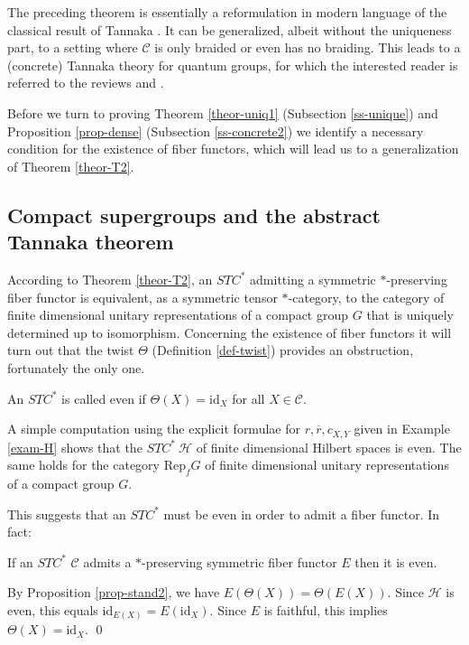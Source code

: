 \documentclass[12pt]{article}
\theoremstyle{definition}
\theoremstyle{definition}
\theoremstyle{remark}
\def\2#1{{\mathcal #1}}
\def\ol#1{{\overline #1}}
\newcommand{\Rep}{\mathrm{Rep}}
\def\id{\mathrm{id}}
\begin{document}
\brem The preceding theorem is essentially a reformulation in modern language of the classical
result of Tannaka \cite{tannaka}. It can be generalized, albeit without the uniqueness part, to a
setting where $\2C$ is only braided or even has no braiding. This leads to a (concrete) Tannaka
theory for quantum groups, for which the interested reader is referred to the reviews \cite{JS1} and
\cite{MRT}. 
\erem

Before we turn to proving Theorem \ref{theor-uniq1} (Subsection \ref{ss-unique}) and Proposition
\ref{prop-dense} (Subsection \ref{ss-concrete2}) we identify a necessary condition for the existence
of fiber functors, which will lead us to a generalization of Theorem \ref{theor-T2}.




\subsection{Compact supergroups and the abstract Tannaka theorem} 
According to Theorem \ref{theor-T2}, an $STC^*$ admitting a symmetric $*$-preserving fiber functor
is equivalent, as a symmetric tensor $*$-category, to the category of finite dimensional unitary
representations of a compact group $G$ that is uniquely determined up to isomorphism. Concerning the
existence of fiber functors it will turn out that the twist $\Theta$ (Definition \ref{def-twist})
provides an obstruction, fortunately the only one.

\bdefin {}
An $STC^*$ is called even if $\Theta(X)=\id_X$ for all $X\in\2C$.
\edefin

\bexam A simple computation using the explicit formulae for $r,\ol{r},c_{X,Y}$ given in Example
\ref{exam-H} shows that the $STC^*\ \2H$ of finite dimensional Hilbert spaces is even. The same
holds for the category $\Rep_fG$ of finite dimensional unitary representations of a compact group
$G$.
\eexam

This suggests that an $STC^*$ must be even in order to admit a fiber functor. In fact:

\bprop If an $STC^*$ $\2C$ admits a $*$-preserving symmetric fiber functor $E$ then it is even.
\eprop

\prf By Proposition \ref{prop-stand2}, we have $E(\Theta(X))=\Theta(E(X))$. Since $\2H$ is even,
this equals $\id_{E(X)}=E(\id_X)$. Since $E$ is faithful, this implies $\Theta(X)=\id_X$.  
\qed
\end{document}
